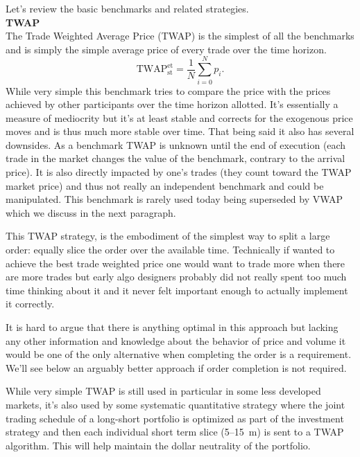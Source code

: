 Let's review the basic benchmarks and related strategies. \\

\noindent\textbf{TWAP} \\


The Trade Weighted Average Price (TWAP) is the simplest of all the benchmarks and is simply the simple average price of every trade over the time horizon. 
        \begin{equation}
        \text{TWAP}_{\text{st}} ^{\text{et}}= \frac{1}{N}\sum_{i=0}^N{p_i}.
        \end{equation}
While very simple this benchmark tries to compare the price with the prices achieved by other participants over the time horizon allotted. It's essentially a measure of mediocrity but it's at least stable and corrects for the exogenous price moves and is thus much more stable over time. That being said it also has several downsides. As a benchmark TWAP is unknown until the end of execution (each trade in the market changes the value of the benchmark, contrary to the arrival price). It is also directly impacted by one's trades (they count toward the TWAP market price) and thus not really an independent benchmark and could be manipulated. This benchmark is rarely used today being superseded by VWAP which we discuss in the next paragraph.


This TWAP strategy, is the embodiment of the simplest way to split a large order: equally slice the order over the available time. Technically if wanted to achieve the best trade weighted price one would want to trade more when there are more trades but early algo designers probably did not really spent too much time thinking about it and it never felt important enough to actually implement it correctly.


It is hard to argue that there is anything optimal in this approach but lacking any other information and knowledge about the behavior of price and volume it would be one of the only alternative when completing the order is a requirement. We'll see below an arguably better approach if order completion is not required. 


While very simple TWAP is still used in particular in some less developed markets, it's also used by some systematic quantitative strategy where the joint trading schedule of a long-short portfolio is optimized as part of the investment strategy and then each individual short term slice (5--15~m) is sent to a TWAP algorithm. This will help maintain the dollar neutrality of the portfolio. \\

